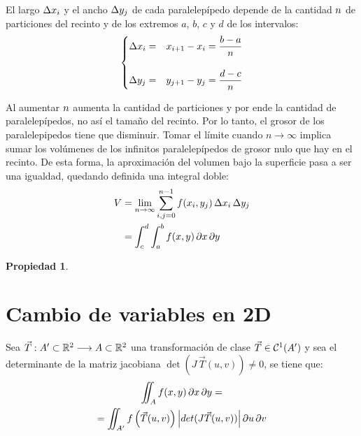 \documentclass[a5paper,12pt,twoside]{book}
\newtheorem{prop}{{Propiedad}}[chapter]
\begin{document}
El largo $\Delta x_i$ y el ancho $\Delta y_j$ de cada paralelepípedo depende de la cantidad $n$ de particiones del recinto y de los extremos $a$, $b$, $c$ y $d$ de los intervalos:
\begin{equation*}
    \left\{
    \begin{aligned}
        \Delta x_i &=& x_{i+1} - x_i = \dfrac{b-a}{n}
        \\[1em]
        \Delta y_j &=& y_{j+1} - y_j = \dfrac{d-c}{n}
    \end{aligned}
    \right.
\end{equation*}

Al aumentar $n$ aumenta la cantidad de particiones y por ende la cantidad de paralelepípedos, no así el tamaño del recinto. Por lo tanto, el grosor de los paralelepipedos tiene que disminuir. Tomar el límite cuando $n\to\infty$ implica sumar los volúmenes de los infinitos paralelepípedos de grosor nulo que hay en el recinto. De esta forma, la aproximación del volumen bajo la superficie pasa a ser una igualdad, quedando definida una integral doble:
\begin{align*}
    V &= \lim_{n\to\infty} \sum_{i,j=0}^{n-1} f(x_i,y_j) \, \Delta x_i \, \Delta y_j
    \\
    &= \int_c^d \int_a^b f(x,y) \, \partial x \, \partial y
\end{align*}

\begin{mdframed}[style=MyFrame1]
    \begin{prop}
    \end{prop}
\end{mdframed}


\section*{Cambio de variables en 2D}

Sea $\Vec{T}:A' \subset \mathbb{R}^2 \longrightarrow A \subset \mathbb{R}^2$ una transformación de clase $\Vec{T} \in \mathcal{C}^{1} (A')$ y sea el determinante de la matriz jacobiana $\operatorname{det}(J \, \Vec{T}(u,v)) \neq 0$, se tiene que:
\begin{multline*}
    \iint_A f(x,y) \, \partial x \, \partial y =
    \\
    = \iint_{A'} f \left( \Vec{T}(u,v) \right) {\left| { det(J \Vec{T}(u,v)) } \right|} \, \partial u \, \partial v
\end{multline*}
\end{document}
